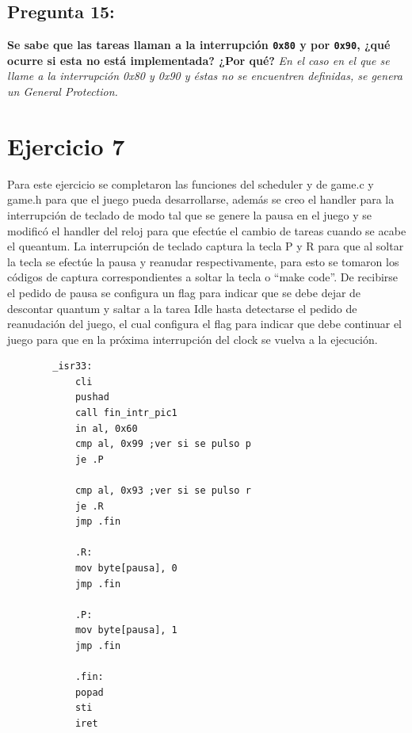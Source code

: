 \documentclass[10pt, a4paper]{article}
\begin{document}
{\subsection{Pregunta 15:}} \textbf{Se sabe que las tareas llaman a la interrupción \texttt{0x80} y por \texttt{0x90}, ¿qué ocurre si esta no está implementada? ¿Por qué?}\newline
\newline
\textit{En el caso en el que se llame a la interrupción 0x80 y 0x90 y éstas no se encuentren definidas, se genera un General Protection.}

\section{Ejercicio 7}
Para este ejercicio se completaron las funciones del scheduler y de game.c y game.h para que el juego pueda desarrollarse, además se creo el handler para la interrupci\'on de teclado de modo tal que se genere la pausa en el juego y se modific\'o el handler del reloj para que efect\'ue el cambio de tareas cuando se acabe el queantum.\newline
La interrupci\'on de teclado captura la tecla P y R para que al soltar la tecla se efect\'ue la pausa y reanudar respectivamente, para esto se tomaron los c\'odigos de captura correspondientes a soltar la tecla o ``make code''. De recibirse el pedido de pausa se configura un flag para indicar que se debe dejar de descontar quantum y saltar a la tarea Idle hasta detectarse el pedido de reanudaci\'on del juego, el cual configura el flag para indicar que debe continuar el juego para que en la pr\'oxima interrupci\'on del clock se vuelva a la ejecuci\'on.\\
\begin{center}
	\begin{verbatim}
		_isr33:
			cli
			pushad
			call fin_intr_pic1
			in al, 0x60
			cmp al, 0x99 ;ver si se pulso p
			je .P
			
			cmp al, 0x93 ;ver si se pulso r
			je .R
			jmp .fin
			
			.R:
			mov byte[pausa], 0
			jmp .fin
			
			.P:
			mov byte[pausa], 1
			jmp .fin
			
			.fin:
			popad
			sti
			iret
	\end{verbatim}
\end{center}
\end{document}
